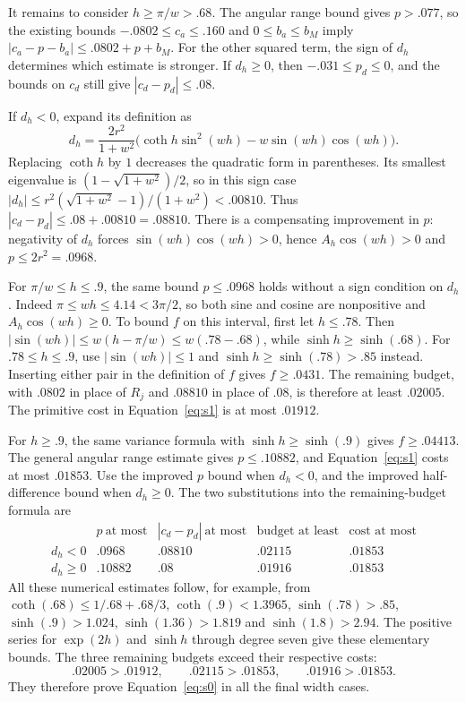 It remains to consider $h\ge\pi/w>.68$.
The angular range bound gives $p>.077$, so the existing bounds
$-.0802\le c_a\le.160$ and $0\le b_a\le b_M$ imply
$|c_a-p-b_a|\le.0802+p+b_M$.
For the other squared term, the sign of $d_h$ determines which
estimate is stronger. If $d_h\ge0$, then
$-.031\le p_d\le0$, and the bounds on $c_d$ still give
$|c_d-p_d|\le.08$.

If $d_h<0$, expand its definition as
\[
 d_h=\frac{2r^2}{1+w^2}
       \bigl(\coth h\sin^2(wh)-w\sin(wh)\cos(wh)\bigr).
\]
Replacing $\coth h$ by $1$ decreases the quadratic form in
parentheses. Its smallest eigenvalue is
$(1-\sqrt{1+w^2})/2$, so in this sign case
$|d_h|\le r^2(\sqrt{1+w^2}-1)/(1+w^2)<.00810$.
Thus $|c_d-p_d|\le.08+.00810=.08810$.
There is a compensating improvement in $p$: negativity of $d_h$
forces $\sin(wh)\cos(wh)>0$, hence
$A_h\cos(wh)>0$ and $p\le2r^2=.0968$.

For $\pi/w\le h\le.9$, the same bound $p\le.0968$ holds
without a sign condition on $d_h$. Indeed
$\pi\le wh\le4.14<3\pi/2$, so both sine and cosine are
nonpositive and $A_h\cos(wh)\ge0$.
To bound $f$ on this interval, first let $h\le.78$.
Then $|\sin(wh)|\le w(h-\pi/w)\le w(.78-.68)$, while
$\sinh h\ge\sinh(.68)$.
For $.78\le h\le.9$, use $|\sin(wh)|\le1$ and
$\sinh h\ge\sinh(.78)>.85$ instead.
Inserting either pair in the definition of $f$ gives $f\ge.0431$.
The remaining budget, with $.0802$ in place of $R_j$ and $.08810$
in place of $.08$, is therefore at least $.02005$.
The primitive cost in Equation~\eqref{eq:s1} is at most $.01912$.

For $h\ge.9$, the same variance formula with
$\sinh h\ge\sinh(.9)$ gives $f\ge.04413$.
The general angular range estimate gives $p\le.10882$, and
Equation~\eqref{eq:s1} costs at most $.01853$.
Use the improved $p$ bound when $d_h<0$, and the improved
half-difference bound when $d_h\ge0$. The two substitutions into
the remaining-budget formula are
\[
\begin{array}{c|cc|cc}
 &p\ \text{at most}&|c_d-p_d|\ \text{at most}
 &\text{budget at least}&\text{cost at most}\\\hline
 d_h<0&.0968&.08810&.02115&.01853\\
 d_h\ge0&.10882&.08&.01916&.01853
\end{array}
\]
All these numerical estimates follow, for example, from
$\coth(.68)\le1/.68+.68/3$, $\coth(.9)<1.3965$,
$\sinh(.78)>.85$, $\sinh(.9)>1.024$,
$\sinh(1.36)>1.819$ and $\sinh(1.8)>2.94$.
The positive series for $\exp(2h)$ and $\sinh h$ through degree
seven give these elementary bounds.
The three remaining budgets exceed their respective costs:
\[
 .02005>.01912,\qquad .02115>.01853,\qquad .01916>.01853.
\]
They therefore prove Equation~\eqref{eq:s0} in all the final width cases.

